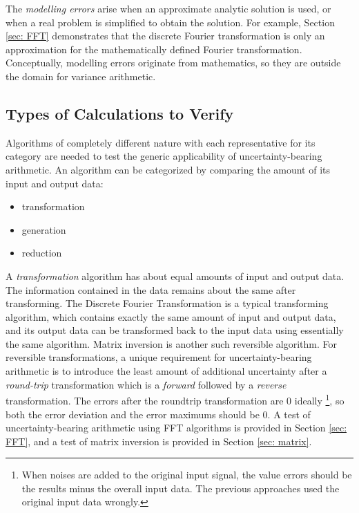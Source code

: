 \documentclass[twoside]{article}
\numberwithin{equation}{section}
\begin{document}
The \emph{modelling errors} arise when an approximate analytic solution is used, or when a real problem is simplified to obtain the solution.  
For example, Section \ref{sec: FFT} demonstrates that the discrete Fourier transformation is only an approximation for the mathematically defined Fourier transformation.  
Conceptually, modelling errors originate from mathematics, so they are outside the domain for variance arithmetic.


\subsection{Types of Calculations to Verify \cite{Prev_Precision_Arithmetic}}

Algorithms of completely different nature with each representative for its category are needed to test the generic applicability of uncertainty-bearing arithmetic.  
An algorithm can be categorized by comparing the amount of its input and output data:
\begin{itemize}
\item transformation
\item generation
\item reduction
\end{itemize}

A \emph{transformation} algorithm has about equal amounts of input and output data.  
The information contained in the data remains about the same after transforming.  
The Discrete Fourier Transformation is a typical transforming algorithm, which contains exactly the same amount of input and output data, and its output data can be transformed back to the input data using essentially the same algorithm.  
Matrix inversion is another such reversible algorithm.  
For reversible transformations, a unique requirement for uncertainty-bearing arithmetic is to introduce the least amount of additional uncertainty after a \emph{round-trip} transformation which is a \emph{forward} followed by a \emph{reverse} transformation.  
The errors after the roundtrip transformation are $0$ ideally \footnote{When noises are added to the original input signal, the value errors should be the results minus the overall input data. The previous approaches \cite{Prev_Precision_Arithmetic} used the original input data wrongly.}, so both the error deviation and the error maximums should be $0$.
A test of uncertainty-bearing arithmetic using FFT algorithms is provided in Section \ref{sec: FFT}, and a test of matrix inversion is provided in Section \ref{sec: matrix}.
\end{document}
